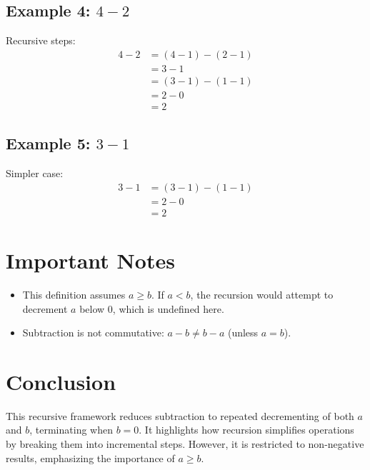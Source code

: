 \documentclass{article}
\begin{document}
\subsection{Example 4: \( 4 - 2 \)}
Recursive steps:
\[
\begin{aligned}
4 - 2 &= (4 - 1) - (2 - 1) \\
&= 3 - 1 \\
&= (3 - 1) - (1 - 1) \\
&= 2 - 0 \\
&= 2
\end{aligned}
\]

\subsection{Example 5: \( 3 - 1 \)}
Simpler case:
\[
\begin{aligned}
3 - 1 &= (3 - 1) - (1 - 1) \\
&= 2 - 0 \\
&= 2
\end{aligned}
\]

\section{Important Notes}
\begin{itemize}
    \item This definition assumes \( a \geq b \). If \( a < b \), the recursion would attempt to decrement \( a \) below 0, which is undefined here.
    \item Subtraction is not commutative: \( a - b \neq b - a \) (unless \( a = b \)).
\end{itemize}

\section{Conclusion}
This recursive framework reduces subtraction to repeated decrementing of both \( a \) and \( b \), terminating when \( b = 0 \). It highlights how recursion simplifies operations by breaking them into incremental steps. However, it is restricted to non-negative results, emphasizing the importance of \( a \geq b \).
\end{document}
